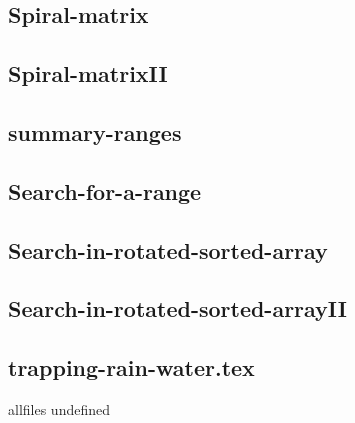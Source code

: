 \documentclass[a4paper,10pt]{article}
\begin{document}
\begin{CJK}{UTF8}{gbsn}
\subsection{Spiral-matrix}


\subsection{Spiral-matrixII}


\subsection{summary-ranges}


\subsection{Search-for-a-range}


\subsection{Search-in-rotated-sorted-array}


\subsection{Search-in-rotated-sorted-arrayII}


\subsection{trapping-rain-water.tex}


\fi

\ifx allfiles undefined
\end{CJK}
\end{document}
